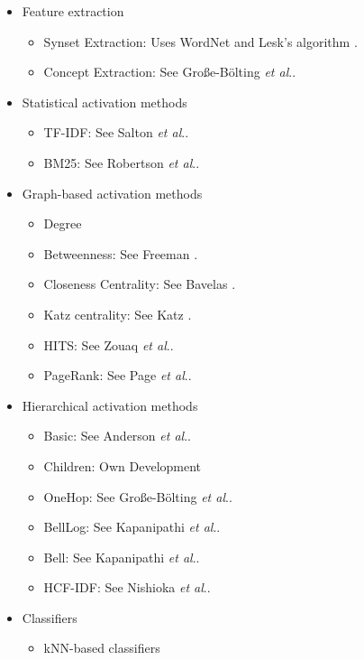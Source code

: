 \documentclass{article}
\newcommand\etal{\textit{et al}.\;}
\begin{document}
\begin{itemize}
  \item Feature extraction
  \begin{itemize}
    \item Synset Extraction: Uses WordNet \cite{wordnet} and Lesk's algorithm \cite{Lesk:1986:ASD:318723.318728}.
    \item Concept Extraction: See Große-Bölting \etal \cite{grosse2015comparison}.
  \end{itemize}
  \item Statistical activation methods
	\begin{itemize}
    \item TF-IDF: See Salton \etal \cite{salton1988term}.
    \item BM25: See Robertson \etal \cite{robertson1999okapi}.
  \end{itemize}
  \item Graph-based activation methods
  \begin{itemize}
    \item Degree
    \item Betweenness: See Freeman \cite{freeman77}.
    \item Closeness Centrality: See Bavelas \cite{bavelas50}.
    \item Katz centrality: See Katz \cite{katz53}.
    \item HITS: See Zouaq \etal \cite{zouaq2012voting}.
    \item PageRank: See Page \etal \cite{page1999pagerank}.
  \end{itemize}
  \item Hierarchical activation methods
  \begin{itemize}
    \item Basic: See Anderson \etal \cite{anderson83}.
    \item Children: Own Development
    \item OneHop: See Große-Bölting \etal \cite{grosse2015comparison}.
    \item BellLog: See Kapanipathi \etal \cite{kapanipathi14}.
    \item Bell: See Kapanipathi \etal \cite{kapanipathi14}.
    \item HCF-IDF: See Nishioka \etal \cite{nishioka2015influence}.
  \end{itemize}
  \item Classifiers
  \begin{itemize}
    \item kNN-based classifiers

\end{itemize}
\end{itemize}
\end{document}
